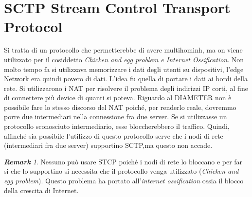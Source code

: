 \documentclass{book}
\theoremstyle{remark}
\newtheorem*{remark}{\textbf{Remark}}
\begin{document}
\section{SCTP Stream Control Transport Protocol}
Si tratta di un protocollo che permetterebbe di avere multihominh, ma on viene utilizzato per il cosiddetto \emph{Chicken and egg problem e Internet Ossification}\@.\newline
Non molto tempo fa si utilizzava memorizzare i dati degli utenti su dispositivi, l'edge Network era quindi povero di dati\@. L'idea fu quella di portare i dati ai bordi della rete\@. Si utilizzarono i NAT per risolvere il problema degli indirizzi IP corti, al fine di connettere più device di quanti si poteva\@. Riguardo al DIAMETER non è possibile fare lo stesso discorso del NAT poiché, per renderlo reale, dovremmo porre due intermediari nella connessione fra due server\@. Se si utilizzasse un protocollo sconosciuto intermediario, esse bloccherebbero il traffico\@. Quindi, affinché sia possibile l'utilizzo di questo protocollo serve che i nodi di rete  (intermediari fra due server) supportino SCTP,ma questo non accade\@.\begin{remark}
	Nessuno può usare STCP poiché i nodi di rete lo bloccano e per far si che lo supportino si necessita che il protocollo venga utilizzato (\emph{Chicken and egg problem})\@. Questo problema ha portato all'\emph{internet ossification} ossia il blocco della crescita di Internet\@.
\end{remark}
\end{document}
